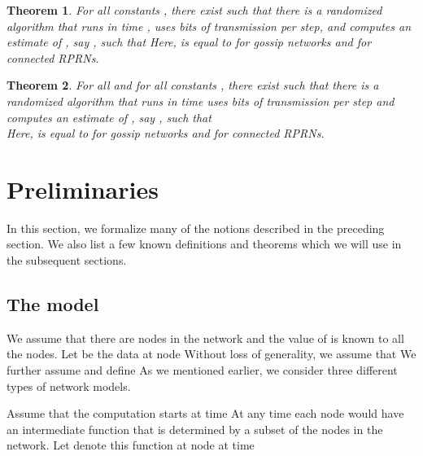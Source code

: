 \documentclass[10pt,twosided,a4paper,draft,onecolumn]{article}
\newtheorem{theorem}{Theorem}
\begin{document}
\begin{theorem}
\label{thm:main}
For all constants , there
exist  such that there is
 a randomized algorithm that runs in time , uses  bits of
transmission per step, and computes an estimate of
, say , such that  Here,  is equal to
 for gossip networks and  for connected RPRNs.

\end{theorem}

\begin{theorem}
\label{thm:Fk}
For all  and for all constants ,
there exist  
such that there is a randomized algorithm that runs in time  uses  bits of transmission per step
and computes an estimate of , say , such that\\
 Here, 
is equal to  for gossip networks and  for connected
RPRNs.

\end{theorem}


\section{Preliminaries}
\label{sec:prem}
In this section, we formalize many of the notions described in the
preceding section. We also list a few known definitions and theorems
which we will use in the subsequent sections.
\subsection{The model}
\label{sec:model}

We assume that there are  nodes in the network and the value of 
is known to all the nodes. Let  be the data at
node  Without loss of generality, we assume that  We further assume  and define  As we mentioned earlier, we consider three different
types of network models.

Assume that the computation starts at time  At any time 
each node would have an intermediate function that is determined by a
subset of the nodes in the network. Let  denote this function
at node  at time  
\end{document}
